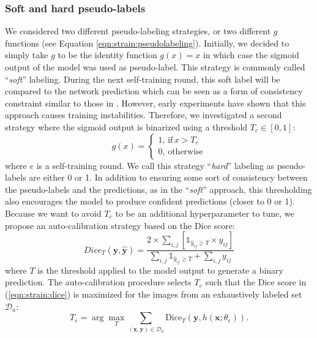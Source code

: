 \subsubsection{Soft and hard pseudo-labels}
\label{sssec:strain:softandhardlabels}

We considered two different pseudo-labeling strategies, or two different $g$ functions (see Equation \ref{eqn:strain:pseudolabeling}). Initially, we decided to simply take $g$ to be the identity function $g(x) = x$ in which case the sigmoid output of the model was used as pseudo-label. This strategy is commonly called  ``\textit{soft}'' labeling. During the next self-training round, this soft label will be compared to the network prediction which can be seen as a form of consistency constraint similar to those in \parencite{laine2016temporal,tarvainen2017mean,sohn2020fixmatch}. However, early experiments have shown that this approach causes training instabilities. Therefore, we investigated a second strategy where the sigmoid output is binarized using a threshold $T_e \in [0, 1]$:
\begin{equation}
g(x) = \begin{cases}
1,\,\text{if}\, x > T_e\\
0,\,\text{otherwise}
\end{cases}
\end{equation}   
where $e$ is a self-training round. We call this strategy ``\textit{hard}'' labeling as pseudo-labels are either 0 or 1. In addition to ensuring some sort of consistency between the pseudo-labels and the predictions, as in the ``\textit{soft}'' approach, this thresholding also encourages the model to produce confident predictions (closer to 0 or 1). Because we want to avoid $T_e$ to be an additional hyperparameter to tune, we propose an auto-calibration strategy based on the Dice score: 
\begin{equation}
  Dice_T(\mathbf{y},\hat{\mathbf{y}}) = \dfrac{2 \times \sum_{i,j} \left[\mathbb{1}_{\hat{y}_{ij} \geq T} \times y_{ij}\right]}{\sum_{i,j} \mathbb{1}_{\hat{y}_{ij} \geq T} + \sum_{i,j} y_{ij}}
  \label{eqn:strain:dice}
\end{equation}
where $T$ is the threshold applied to the model output to generate a binary prediction. The auto-calibration procedure selects $T_e$ such that the Dice score in (\ref{eqn:strain:dice}) is maximized for the images from an exhaustively labeled set  $\mathcal{D}_{a}$:
\begin{equation}
T_e = \arg \underset{T}{\max} \sum_{(\mathbf{x}, \mathbf{y}) \in \mathcal{D}_a} \text{Dice}_T\left(\mathbf{y},h( \mathbf{x}; \theta_{e})\right).
\label{eqn:strain:thresholdopt}
\end{equation}
